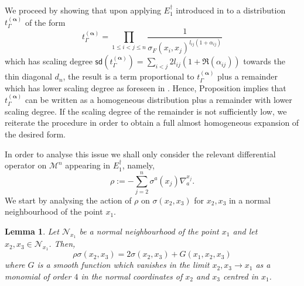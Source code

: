 \documentclass[10pt]{book}
\newcommand{\sd}{\mathsf{sd}}
\newcommand{\Mcal}{\mathcal{M}}
\newcommand{\Ncal}{\mathcal{N}}
\theoremstyle{break}
\newtheorem{lemma}{Lemma}
\begin{document}
We proceed by showing that upon applying $E^\dagger_1$ introduced in  %
to a distribution $t_\Gamma^{(\boldsymbol{\alpha})}$ of the form
\[
t_\Gamma^{(\boldsymbol{\alpha})}=\prod_{1\leq i < j \leq n } \frac{1}{\sigma_F(x_i,x_j)^{l_{ij}(1+ \alpha_{ij})}}
\]
which has scaling degree $\sd(t_\Gamma^{(\boldsymbol{\alpha})}) = \sum_{i<j} 2 l_{ij}(1+ \Re(\alpha_{ij}))$ towards the thin diagonal $d_n$, the result is a term proportional to $t_\Gamma^{(\boldsymbol{\alpha})}$ plus a remainder which has lower scaling degree as foreseen in %
. Hence, Proposition %
implies that $t_\Gamma^{(\boldsymbol{\alpha})}$ can be written as a homogeneous distribution plus a remainder with lower scaling degree. If the scaling degree of the remainder is not sufficiently low, we reiterate the procedure in order to obtain a full almost homogeneous expansion of the desired form.

In order to analyse this issue we shall only consider the relevant differential operator on $\Mcal^n$ appearing in $E_1^\dagger$, namely,
\begin{equation}
\rho:= -  \sum_{j=2}^n \sigma^a(x_j) \nabla^{x_j}_a.    
\end{equation}
We start by analysing the action of $\rho$ on $\sigma(x_2,x_3)$ for $x_2,x_3$ in a normal neighbourhood of the point $x_1$.

\begin{lemma}Let $\Ncal_{x_1}$ be a normal neighbourhood of the point $x_1$ and let $x_2,x_3\in\Ncal_{x_1}$.
Then,  
\[
\rho \sigma(x_2,x_3) = 2\sigma(x_2,x_3) + G(x_1,x_2,x_3)    
\]
where $G$ is a smooth function which vanishes in the limit $x_2,x_3\to x_1$ as a monomial of order $4$ in the normal coordinates of $x_2$ and $x_3$ centred in $x_1$. 
\end{lemma}
\end{document}
